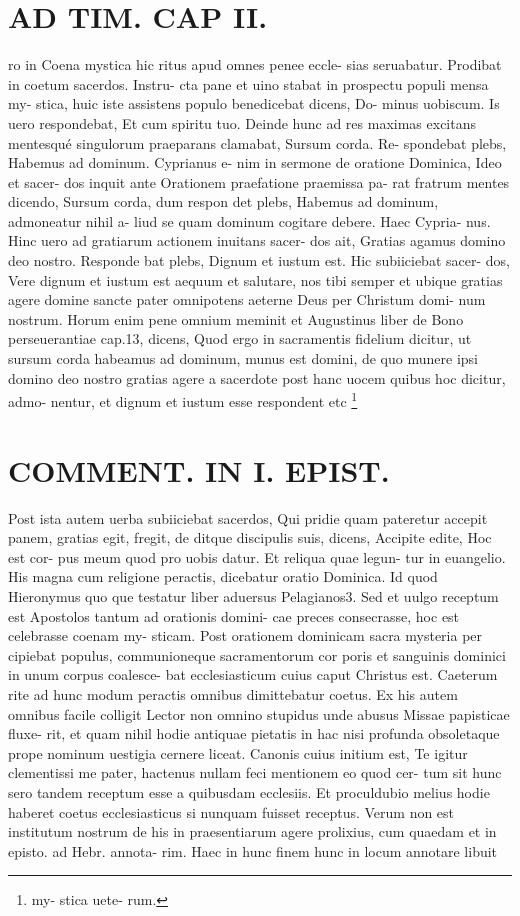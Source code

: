 \documentclass{article}
\begin{document}
\begin{pages}
\section*{AD TIM. CAP II. }
\marginpar{[ p.109 ]}\pstart ro in Coena mystica hic ritus apud omnes penee eccle- sias seruabatur. Prodibat in coetum sacerdos. Instru- cta pane et uino stabat in prospectu populi mensa my- stica, huic iste assistens populo benedicebat dicens, Do- minus uobiscum. Is uero respondebat, Et cum spiritu tuo. Deinde hunc ad res maximas excitans mentesqué singulorum praeparans clamabat, Sursum corda. Re- spondebat plebs, Habemus ad dominum. Cyprianus e- nim in sermone de oratione Dominica, Ideo et sacer- dos inquit ante Orationem praefatione praemissa pa- rat fratrum mentes dicendo, Sursum corda, dum respon det plebs, Habemus ad dominum, admoneatur nihil a- liud se quam dominum cogitare debere. Haec Cypria- nus. Hinc uero ad gratiarum actionem inuitans sacer- dos ait, Gratias agamus domino deo nostro. Responde bat plebs, Dignum et iustum est. Hic subiiciebat sacer- dos, Vere dignum et iustum est aequum et salutare, nos tibi semper et ubique gratias agere domine sancte pater omnipotens aeterne Deus per Christum domi- num nostrum. Horum enim pene omnium meminit et Augustinus liber  de Bono perseuerantiae cap.13, dicens, Quod ergo in sacramentis fidelium dicitur, ut sursum corda habeamus ad dominum, munus est domini, de quo munere ipsi domino deo nostro gratias agere a sacerdote post hanc uocem quibus hoc dicitur, admo- nentur, et dignum et iustum esse respondent etc  \pend\footnote{\footnotesizeCoena my- stica uete- rum. }
\section*{COMMENT. IN I. EPIST. }\pstart Post ista autem uerba subiiciebat sacerdos, Qui pridie quam pateretur accepit panem, gratias egit, fregit, de ditque discipulis suis, dicens, Accipite edite, Hoc est cor- pus meum quod pro uobis datur. Et reliqua quae legun- tur in euangelio. His magna cum religione peractis, dicebatur oratio Dominica. Id quod Hieronymus quo que testatur liber  aduersus Pelagianos3. Sed et uulgo receptum est Apostolos tantum ad orationis domini- cae preces consecrasse, hoc est celebrasse coenam my- sticam. Post orationem dominicam sacra mysteria per cipiebat populus, communioneque sacramentorum cor poris et sanguinis dominici in unum corpus coalesce- bat ecclesiasticum cuius caput Christus est. Caeterum rite ad hunc modum peractis omnibus dimittebatur coetus. Ex his autem omnibus facile colligit Lector non omnino stupidus unde abusus Missae papisticae fluxe- rit, et quam nihil hodie antiquae pietatis in hac nisi profunda obsoletaque prope nominum uestigia cernere liceat. Canonis cuius initium est, Te igitur clementissi me pater, hactenus nullam feci mentionem eo quod cer- tum sit hunc sero tandem receptum esse a quibusdam ecclesiis. Et proculdubio melius hodie haberet coetus ecclesiasticus si nunquam fuisset receptus. Verum non est institutum nostrum de his in praesentiarum agere prolixius, cum quaedam et in episto. ad Hebr. annota- rim. Haec in hunc finem hunc in locum annotare libuit  \pend

\end{pages}
\end{document}
